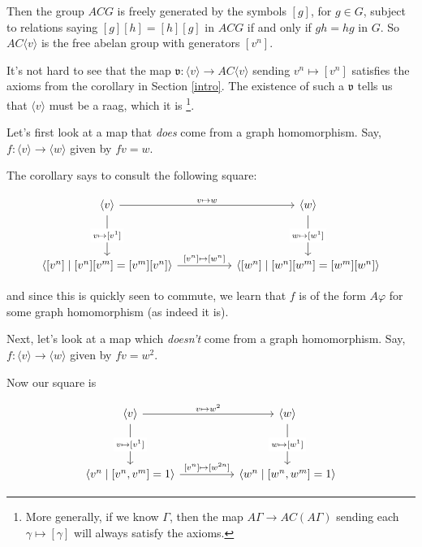 \documentclass[12pt]{article}
\theoremstyle{definition}
\theoremstyle{theorem}
\begin{document}
Then the group $ACG$ is freely generated by the symbols $[g]$, for $g \in G$,
subject to relations saying $[g][h] = [h][g]$ in $ACG$ if and only if 
$gh = hg$ in $G$. So $AC \langle v \rangle$ is the free abelan group with 
generators $[v^n]$.

It's not hard to see that the map 
$\mathfrak{v} : \langle v \rangle \to AC \langle v \rangle$
sending $v^n \mapsto [v^n]$ satisfies the axioms from the corollary in 
Section \ref{intro}. The existence of such a $\mathfrak{v}$ tells us that 
$\langle v \rangle$ must be a raag, which it is%
\footnote{More generally, if we know $\Gamma$, then the map 
$A\Gamma \to AC(A\Gamma)$ sending each $\gamma \mapsto [\gamma]$ 
will always satisfy the axioms.}.

\bigskip

Let's first look at a map that \emph{does} come from a graph homomorphism.
Say, $f : \langle v \rangle \to \langle w \rangle$ given by $fv = w$.

The corollary says to consult the following square:

\[
  \begin{tikzcd}
    {\langle v \rangle} && {\langle w \rangle} \\
    \\
    {\left \langle [v^n] \mid [v^n][v^m] = [v^m][v^n] \right \rangle} 
    && 
    {\left \langle [w^n] \mid [w^n][w^m] = [w^m][w^n] \right \rangle}
    \arrow["{v \mapsto w}", from=1-1, to=1-3]
    \arrow["{[v^n] \mapsto [w^n]}", from=3-1, to=3-3]
    \arrow["{v \mapsto [v^1]}"{description}, from=1-1, to=3-1]
    \arrow["{w \mapsto [w^1]}"{description}, from=1-3, to=3-3]
  \end{tikzcd}
\]

and since this is quickly seen to commute, we learn that $f$ is of the form 
$A \varphi$ for some graph homomorphism (as indeed it is).

\bigskip

Next, let's look at a map which \emph{doesn't} come from a graph homomorphism.
Say, $f : \langle v \rangle \to \langle w \rangle$ given by $fv = w^2$.

Now our square is

\[\begin{tikzcd}
	{\langle v \rangle} && {\langle w \rangle} \\
	\\
	{\langle v^n \mid [v^n,v^m] = 1 \rangle} && {\langle w^n \mid [w^n, w^m] = 1 \rangle}
	\arrow["{v \mapsto w^2}", from=1-1, to=1-3]
  \arrow["{[v^n] \mapsto [w^{2n}]}", from=3-1, to=3-3]
	\arrow["{v \mapsto [v^1]}"{description}, from=1-1, to=3-1]
	\arrow["{w \mapsto [w^1]}"{description}, from=1-3, to=3-3]
\end{tikzcd}\]
\end{document}
